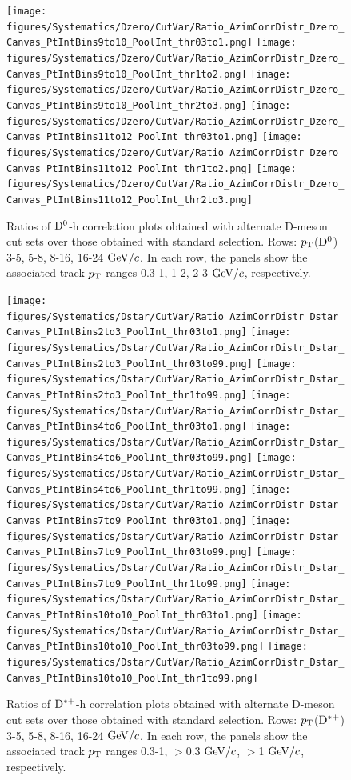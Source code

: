 \begin{figure}
{\texttt{[image: figures/Systematics/Dzero/CutVar/Ratio\_AzimCorrDistr\_Dzero\_Canvas\_PtIntBins9to10\_PoolInt\_thr03to1.png]}}
{\texttt{[image: figures/Systematics/Dzero/CutVar/Ratio\_AzimCorrDistr\_Dzero\_Canvas\_PtIntBins9to10\_PoolInt\_thr1to2.png]}}
{\texttt{[image: figures/Systematics/Dzero/CutVar/Ratio\_AzimCorrDistr\_Dzero\_Canvas\_PtIntBins9to10\_PoolInt\_thr2to3.png]}}
{\texttt{[image: figures/Systematics/Dzero/CutVar/Ratio\_AzimCorrDistr\_Dzero\_Canvas\_PtIntBins11to12\_PoolInt\_thr03to1.png]}}
{\texttt{[image: figures/Systematics/Dzero/CutVar/Ratio\_AzimCorrDistr\_Dzero\_Canvas\_PtIntBins11to12\_PoolInt\_thr1to2.png]}}
{\texttt{[image: figures/Systematics/Dzero/CutVar/Ratio\_AzimCorrDistr\_Dzero\_Canvas\_PtIntBins11to12\_PoolInt\_thr2to3.png]}}
 \caption{Ratios of ${\rm D^0}$-h correlation plots obtained with alternate D-meson cut sets over those obtained with standard selection. Rows: $p_{\rm T}$(${\rm D^0}$) 3-5, 5-8, 8-16, 16-24 $\mathrm{GeV}/c$. In each row, the panels show the associated track $p_{\rm T}$ ranges 0.3-1, 1-2, 2-3 $\mathrm{GeV}/c$, respectively.}
\label{fig:Syst_D0CutVar}
\end{figure}

\begin{figure}
\centering
{\texttt{[image: figures/Systematics/Dstar/CutVar/Ratio\_AzimCorrDistr\_Dstar\_Canvas\_PtIntBins2to3\_PoolInt\_thr03to1.png]}}
{\texttt{[image: figures/Systematics/Dstar/CutVar/Ratio\_AzimCorrDistr\_Dstar\_Canvas\_PtIntBins2to3\_PoolInt\_thr03to99.png]}}
{\texttt{[image: figures/Systematics/Dstar/CutVar/Ratio\_AzimCorrDistr\_Dstar\_Canvas\_PtIntBins2to3\_PoolInt\_thr1to99.png]}}
{\texttt{[image: figures/Systematics/Dstar/CutVar/Ratio\_AzimCorrDistr\_Dstar\_Canvas\_PtIntBins4to6\_PoolInt\_thr03to1.png]}}
{\texttt{[image: figures/Systematics/Dstar/CutVar/Ratio\_AzimCorrDistr\_Dstar\_Canvas\_PtIntBins4to6\_PoolInt\_thr03to99.png]}}
{\texttt{[image: figures/Systematics/Dstar/CutVar/Ratio\_AzimCorrDistr\_Dstar\_Canvas\_PtIntBins4to6\_PoolInt\_thr1to99.png]}}
{\texttt{[image: figures/Systematics/Dstar/CutVar/Ratio\_AzimCorrDistr\_Dstar\_Canvas\_PtIntBins7to9\_PoolInt\_thr03to1.png]}}
{\texttt{[image: figures/Systematics/Dstar/CutVar/Ratio\_AzimCorrDistr\_Dstar\_Canvas\_PtIntBins7to9\_PoolInt\_thr03to99.png]}}
{\texttt{[image: figures/Systematics/Dstar/CutVar/Ratio\_AzimCorrDistr\_Dstar\_Canvas\_PtIntBins7to9\_PoolInt\_thr1to99.png]}}
{\texttt{[image: figures/Systematics/Dstar/CutVar/Ratio\_AzimCorrDistr\_Dstar\_Canvas\_PtIntBins10to10\_PoolInt\_thr03to1.png]}}
{\texttt{[image: figures/Systematics/Dstar/CutVar/Ratio\_AzimCorrDistr\_Dstar\_Canvas\_PtIntBins10to10\_PoolInt\_thr03to99.png]}}
{\texttt{[image: figures/Systematics/Dstar/CutVar/Ratio\_AzimCorrDistr\_Dstar\_Canvas\_PtIntBins10to10\_PoolInt\_thr1to99.png]}}
 \caption{Ratios of ${\rm D^{*+}}$-h correlation plots obtained with alternate D-meson cut sets over those obtained with standard selection. Rows: $p_{\rm T}$(${\rm D^{*+}}$) 3-5, 5-8, 8-16, 16-24 $\mathrm{GeV}/c$. In each row, the panels show the associated track $p_{\rm T}$ ranges 0.3-1, $>$0.3 $\mathrm{GeV}/c$,  $>$1 $\mathrm{GeV}/c$, respectively.}
\label{fig:Syst_DstarCutVar}
\end{figure}

